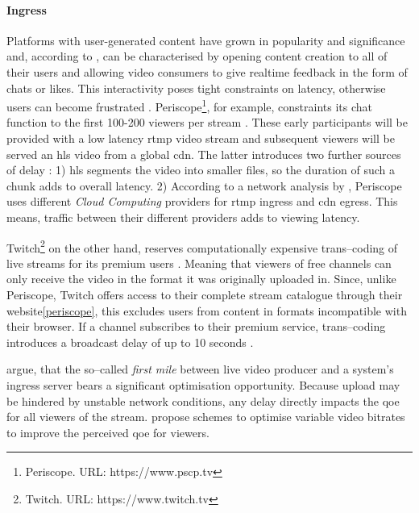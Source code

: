 \paragraph{Ingress}
Platforms with user-generated content have grown in popularity and significance and, according to \citet{twitch-case}, can be characterised by opening content creation to all of their users and allowing video consumers to give realtime feedback in the form of chats or likes. This interactivity poses tight constraints on latency, otherwise users can become frustrated \cite[\S5]{periscope-experience}. Periscope\footnote{\label{periscope}Periscope. URL:  {https://www.pscp.tv}}, for example, constraints its chat function to the first 100-200 viewers per stream \cite{anatomy-personalized-livestreaming}. These early participants will be provided with a low latency \gls{rtmp} video stream and subsequent viewers will be served an \gls{hls} video from a global \gls{cdn}. The latter introduces two further sources of delay \cite[\S2-3]{periscope-experience}: 1) \gls{hls} segments the video into smaller files, so the duration of such a chunk adds to overall latency. 2) According to a network analysis by \citet{periscope-experience}, Periscope uses different \textit{Cloud Computing} providers for \gls{rtmp} ingress and \gls{cdn} egress. This means, traffic between their different providers adds to viewing latency.

Twitch\footnote{\label{twitch}Twitch. URL: {https://www.twitch.tv}} on the other hand, reserves computationally expensive trans–coding of live streams for its premium users \cite[\S2]{twitch-measurement-study}. Meaning that viewers of free channels can only receive the video in the format it was originally uploaded in. Since, unlike Periscope, Twitch offers access to their complete stream catalogue through their website\vref{periscope}, this excludes users from content in formats incompatible with their browser. If a channel subscribes to their premium service, trans–coding introduces a broadcast delay of up to 10 seconds \cite[\S4.2]{twitch-measurement-study}.

\citet[\S{III.A}]{content-harvest-network} argue, that the so–called \textit{first mile} between live video producer and a system's ingress server bears a significant optimisation opportunity. Because upload may be hindered by unstable network conditions, any delay directly impacts the \gls{qoe} for all viewers of the stream. \citet*{personalized-live-streaming-experience} propose schemes to optimise variable video bitrates to improve the perceived \gls{qoe} for viewers.

